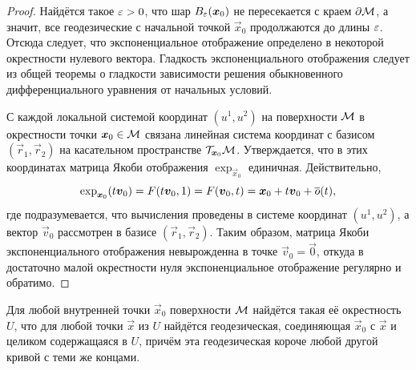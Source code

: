 \begin{proof}
	Найдётся такое $\varepsilon > 0$, что шар $B_{\varepsilon}(\boldsymbol{x}_0)$ не пересекается с краем $\partial\mathcal{M}$, а значит, все геодезические с начальной точкой $\vec{x}_0$ продолжаются до длины $\varepsilon$. Отсюда следует, что экспоненциальное отображение определено в некоторой окрестности нулевого вектора. Гладкость экспоненциального отображения следует из общей теоремы о гладкости зависимости решения обыкновенного дифференциального уравнения от начальных условий.

	С каждой локальной системой координат $(u^1, u^2)$ на поверхности $\mathcal{M}$ в окрестности точки $\boldsymbol{x}_0 \in \mathcal{M}$ связана линейная система координат с базисом $(\vec{r}_1, \vec{r}_2)$ на касательном пространстве $\mathcal{T}_{\boldsymbol{x}_0}\mathcal{M}$. Утверждается, что в этих координатах матрица Якоби отображения $\exp_{\vec{x}_0}$ единичная. Действительно,
	\[
		\exp_{\boldsymbol{x}_0}(t\boldsymbol{v}_0) = F(t\boldsymbol{v}_0, 1) = F(\boldsymbol{v}_0, t) = \boldsymbol{x}_0 + t\boldsymbol{v}_0 + \overline{o}(t),
	\]
	где подразумевается, что вычисления проведены в системе координат $(u^1, u^2)$, а вектор $\vec{v}_0$ рассмотрен в базисе $(\vec{r}_1, \vec{r}_2)$. Таким образом, матрица Якоби экспоненциального отображения невырожденна в точке $\vec{v}_0 = \vec{0}$, откуда в достаточно малой окрестности нуля экспоненциальное отображение регулярно и обратимо.
\end{proof}

\begin{theorem} \label{theorem:Eexp}
	Для любой внутренней точки $\vec{x}_0$ поверхности $\mathcal{M}$ найдётся такая её окрестность $U$, что для любой точки $\vec{x}$ из $U$ найдётся геодезическая, соединяющая $\vec{x}_0$ с $\vec{x}$ и целиком содержащаяся в $U$, причём эта геодезическая короче любой другой кривой с теми же концами.
\end{theorem}


